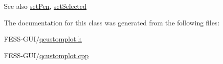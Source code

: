\begin{DoxySeeAlso}{See also}
\hyperlink{class_q_c_p_item_rect_a483c0da5a17e1646cd17ddea2c124e7d}{set\+Pen}, \hyperlink{class_q_c_p_abstract_item_a203de94ad586cc44d16c9565f49d3378}{set\+Selected} 
\end{DoxySeeAlso}


The documentation for this class was generated from the following files\+:\begin{DoxyCompactItemize}
\item 
F\+E\+S\+S-\/\+G\+U\+I/\hyperlink{qcustomplot_8h}{qcustomplot.\+h}\item 
F\+E\+S\+S-\/\+G\+U\+I/\hyperlink{qcustomplot_8cpp}{qcustomplot.\+cpp}\end{DoxyCompactItemize}
